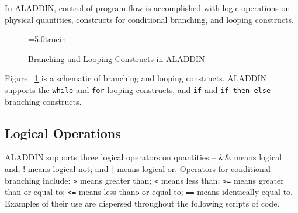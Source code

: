 \vspace{0.15 in}
\noindent\hspace{0.5 in}
In ALADDIN, control of program flow is accomplished with
logic operations on physical quantities,
constructs for conditional branching, and looping constructs.

\begin{figure}[ht]
\vspace{0.15 in}
\epsfxsize=5.0truein
\centerline{}
\caption{Branching and Looping Constructs in ALADDIN}
\label{fig: aladdin-branch-and-loop-part2}
\end{figure}

\vspace{0.15 in}\noindent
Figure ~\ref{fig: aladdin-branch-and-loop-part2} is a schematic
of branching and looping constructs.
ALADDIN supports the {\tt while} and {\tt for} looping constructs,
and {\tt if} and {\tt if-then-else} branching constructs.

\subsection{Logical Operations}

\vspace{0.15 in}
\noindent\hspace{0.5 in}
ALADDIN supports three logical operators on quantities --
{\tt $\&\&$} means logical and;
{\tt $!$} means logical not;
and {\tt $\Vert$} means logical or.
Operators for conditional branching include:
{\tt >} means greater than;
{\tt <} means less than;
{\tt >=} means greater than or equal to;
{\tt <=} means less thano or equal to;
{\tt ==} means identically equal to.
Examples of their use are dispersed throughout
the following scripts of code.

